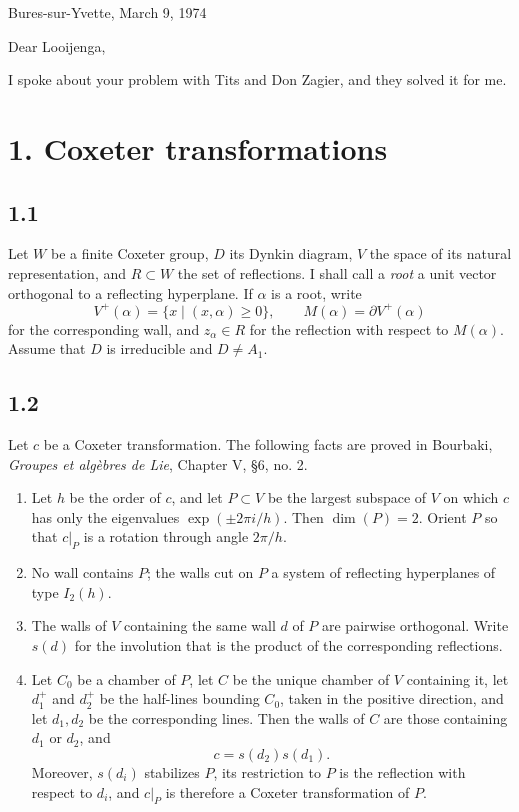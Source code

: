 \documentclass[11pt]{article}
\theoremstyle{plainen}
\begin{document}
\begin{flushright}
Bures-sur-Yvette, March 9, 1974
\end{flushright}

Dear Looijenga,

I spoke about your problem with Tits and Don Zagier, and they solved it for me.

\section*{1. Coxeter transformations}

\subsection*{1.1}
Let $W$ be a finite Coxeter group, $D$ its Dynkin diagram, $V$ the space of its natural representation, and $R\subset W$ the set of reflections. I shall call a \emph{root} a unit vector orthogonal to a reflecting hyperplane. If $\alpha$ is a root, write
\[
 V^+(\alpha)=\{x\mid (x,\alpha)\geq 0\},\qquad M(\alpha)=\partial V^+(\alpha)
\]
for the corresponding wall, and $z_\alpha\in R$ for the reflection with respect to $M(\alpha)$. Assume that $D$ is irreducible and $D\ne A_1$.

\subsection*{1.2}
Let $c$ be a Coxeter transformation. The following facts are proved in Bourbaki, \emph{Groupes et algèbres de Lie}, Chapter V, §6, no. 2.

\begin{enumerate}[label=(\roman*),leftmargin=2.2em]
\item Let $h$ be the order of $c$, and let $P\subset V$ be the largest subspace of $V$ on which $c$ has only the eigenvalues $\exp(\pm2\pi i/h)$. Then $\dim(P)=2$. Orient $P$ so that $c\vert_P$ is a rotation through angle $2\pi/h$.

\item No wall contains $P$; the walls cut on $P$ a system of reflecting hyperplanes of type $I_2(h)$.

\item The walls of $V$ containing the same wall $d$ of $P$ are pairwise orthogonal. Write $s(d)$ for the involution that is the product of the corresponding reflections.

\item Let $C_0$ be a chamber of $P$, let $C$ be the unique chamber of $V$ containing it, let $d_1^+$ and $d_2^+$ be the half-lines bounding $C_0$, taken in the positive direction, and let $d_1,d_2$ be the corresponding lines. Then the walls of $C$ are those containing $d_1$ or $d_2$, and
\[
 c=s(d_2)s(d_1).
\]
Moreover, $s(d_i)$ stabilizes $P$, its restriction to $P$ is the reflection with respect to $d_i$, and $c\vert_P$ is therefore a Coxeter transformation of $P$.
\end{enumerate}
\end{document}
